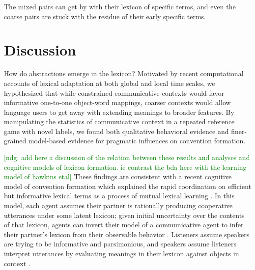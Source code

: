\documentclass[10pt,letterpaper]{article}
\newcommand{\ndg}[1]{\textcolor{Green}{[ndg: #1]}}
\begin{document}
The mixed pairs can get by with their lexicon of specific terms, and even the coarse pairs are stuck with the residue of their early specific terms. 


\section{Discussion}

How do abstractions emerge in the lexicon? Motivated by recent computational accounts of lexical adaptation at both global and local time scales, we hypothesized that while constrained communicative contexts would favor informative one-to-one object-word mappings, coarser contexts would allow language users to get away with extending meanings to broader features. By manipulating the statistics of communicative context in a repeated reference game with novel labels, we found both qualitative behavioral evidence and finer-grained model-based evidence for pragmatic influences on convention formation.

\ndg{add here a discussion of the relation between these results and analyses and cognitive models of lexicon formation. ie contrast the bda here with the learning model of hawkins etal}
These findings are consistent with a recent cognitive model of convention formation which explained the rapid coordination on efficient but informative lexical terms as a process of mutual lexical learning \cite{HawkinsFrankGoodman17_ConventionFormation}. In this model, each agent assumes their partner is rationally producing cooperative utterances under some latent lexicon; given initial uncertainty over the contents of that lexicon, agents can invert their model of a communicative agent to infer their partner's lexicon from their observable behavior \cite{BergenLevyGoodman16_LexicalUncertainty}. %
Listeners assume speakers are trying to be informative and parsimonious, and speakers assume listeners interpret utterances by evaluating meanings in their lexicon against objects in context \cite{FrankGoodman12_PragmaticReasoningLanguageGames,GoodmanFrank16_RSATiCS}. 
\end{document}

